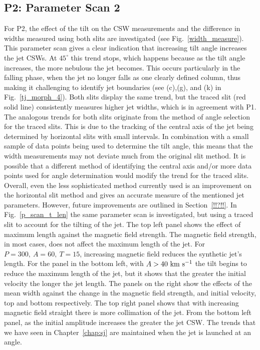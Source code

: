 \subsection{P2: Parameter Scan 2}
\label{subsec:pscansII_II}
For P2, the effect of the tilt on the CSW measurements and the difference in widths measured using both slits are investigated (see Fig.~\ref{width_measure}). This parameter scan gives a clear indication that increasing tilt angle increases the jet CSWs. At $45^{\circ}$ this trend stops, which happens because as the tilt angle increases, the more nebulous the jet becomes. This occurs particularly in the falling phase, when the jet no longer falls as one clearly defined column, thus making it challenging to identify jet boundaries (see (c),(g), and (k) in Fig.~\ref{tj_morph_4}). Both slits display the same trend, but the traced slit (red solid line) consistently measures higher jet widths, which is in agreement with P1. The analogous trends for both slits originate from the method of angle selection for the traced slits. This is due to the tracking of the central axis of the jet being determined by horizontal slits with small intervals. In combination with a small sample of data points being used to determine the tilt angle, this means that the width measurements may not deviate much from the original slit method. It is possible that a different method of identifying the central axis and/or more data points used for angle determination would modify the trend for the traced slits. Overall, even the less sophisticated method currently used is an improvement on the horizontal slit method and gives an accurate measure of the mentioned jet parameters. However, future improvements are outlined in Section~\ref{!!?!!}. \np
%
In Fig.~\ref{p_scan_t_len} the same parameter scan is investigated, but using a traced slit to account for the tilting of the jet. The top left panel shows the effect of maximum length against the magnetic field strength. The magnetic field strength, in most cases, does not affect the maximum length of the jet. For $P=300,~A=60,~T=15$, increasing magnetic field reduces the synthetic jet's length. For the panel in the bottom left, with $A>40 ~\rm{km ~s^{-1}}$ the tilt begins to reduce the maximum length of the jet, but it shows that the greater the initial velocity the longer the jet length. The panels on the right show the effects of the mean width against the change in the magnetic field strength, and initial velocity, top and bottom respectively. The top right panel shows that with increasing magnetic field straight there is more collimation of the jet. From the bottom left panel, as the initial amplitude increases the greater the jet CSW. The trends that we have seen in Chapter~\ref{chap:sj} are maintained when the jet is launched at an angle.  \np
